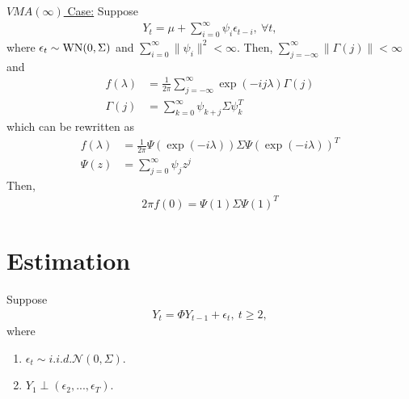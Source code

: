 \documentclass[11pt]{elegantbook}
\begin{document}
\begin{example}
    \underline{$VMA(\infty)$ Case:} Suppose
    \begin{equation}
        \begin{aligned}
            Y_t=\mu+\sum_{i=0}^\infty\psi_i\epsilon_{t-i},\ \forall t,
        \end{aligned}
        \nonumber
    \end{equation}
    where $\epsilon_t\sim \textnormal{WN}(0,\Sigma)$ and $\sum_{i=0}^\infty\|\psi_i\|^2<\infty$. Then, $\sum_{j=-\infty}^\infty \|\Gamma(j)\|<\infty$ and
    \begin{equation}
        \begin{aligned}
            f(\lambda)&=\frac{1}{2\pi}\sum_{j=-\infty}^\infty \exp\left(-ij\lambda\right)\Gamma(j)\\
            \Gamma(j)&=\sum_{k=0}^\infty\psi_{k+j}\Sigma\psi_{k}^T
        \end{aligned}
        \nonumber
    \end{equation}
    which can be rewritten as
    \begin{equation}
        \begin{aligned}
            f(\lambda)&=\frac{1}{2\pi}\Psi(\exp\left(-i\lambda\right))\Sigma\Psi(\exp\left(-i\lambda\right))^T\\
            \Psi(z)&=\sum_{j=0}^\infty\psi_jz^j
        \end{aligned}
        \nonumber
    \end{equation}
    Then,
    \begin{equation}
        \begin{aligned}
            2\pi f(0)=\Psi(1)\Sigma\Psi(1)^T
        \end{aligned}
        \nonumber
    \end{equation}
\end{example}


\section{Estimation}
Suppose
\begin{equation}
    \begin{aligned}
        Y_t=\Phi Y_{t-1} + \epsilon_t, \ t\geq 2,
    \end{aligned}
    \nonumber
\end{equation}
where
\begin{enumerate}
    \item $\epsilon_t\sim {i.i.d.} \mathcal{N}(0,\Sigma)$.
    \item $Y_1\perp (\epsilon_2,...,\epsilon_T)$.
\end{enumerate}
\end{document}
